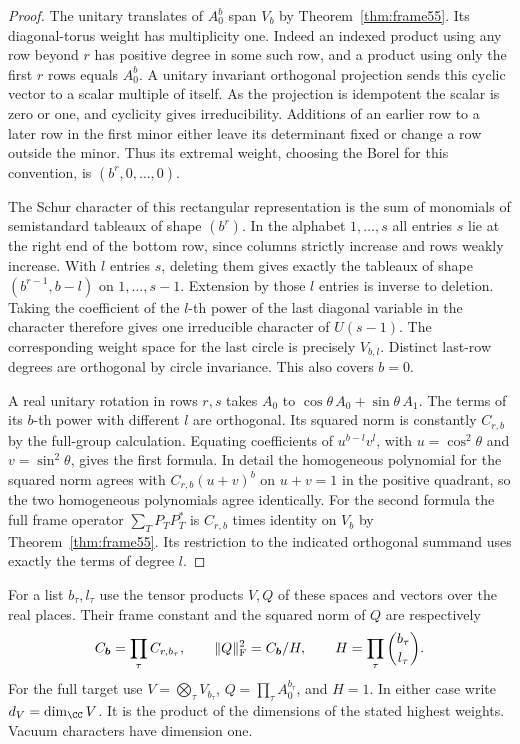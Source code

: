 \documentclass[a4paper,11pt]{article}
\theoremstyle{definition}
\theoremstyle{remark}
\numberwithin{equation}{section}
\begin{document}
\begin{proof}
The unitary translates of \(A_0^b\) span \(V_b\) by
Theorem~\ref{thm:frame55}. Its diagonal-torus weight has
multiplicity one. Indeed an indexed product using any row beyond
\(r\) has positive degree in some such row, and a product using
only the first \(r\) rows equals \(A_0^b\). A unitary invariant
orthogonal projection sends this cyclic vector to a scalar
multiple of itself. As the projection is idempotent the scalar
is zero or one, and cyclicity gives irreducibility. Additions of
an earlier row to a later row in the first minor either leave its
determinant fixed or change a row outside the minor. Thus its
extremal weight, choosing the Borel for this convention, is
\((b^r,0,\ldots,0)\).

The Schur character of this rectangular representation is the
sum of monomials of semistandard tableaux of shape \((b^r)\).
In the alphabet \(1,\ldots,s\) all entries \(s\) lie at the
right end of the bottom row, since columns strictly increase
and rows weakly increase. With \(l\) entries \(s\), deleting
them gives exactly the tableaux of shape \((b^{r-1},b-l)\)
on \(1,\ldots,s-1\). Extension by those \(l\) entries is
inverse to deletion. Taking the coefficient of the \(l\)-th
power of the last diagonal variable in the character therefore
gives one irreducible character of \(U(s-1)\). The corresponding
weight space for the last circle is precisely \(V_{b,l}\).
Distinct last-row degrees are orthogonal by circle invariance.
This also covers \(b=0\).

A real unitary rotation in rows \(r,s\) takes \(A_0\) to
\(\cos\theta\, A_0+\sin\theta\, A_1\). The terms of its \(b\)-th
power with different \(l\) are orthogonal. Its squared norm is
constantly \(C_{r,b}\) by the full-group calculation. Equating
coefficients of \(u^{b-l}v^l\), with \(u=\cos^2\theta\) and
\(v=\sin^2\theta\), gives the first formula. In detail the
homogeneous polynomial for the squared norm agrees with
\(C_{r,b}(u+v)^b\) on \(u+v=1\) in the positive quadrant,
so the two homogeneous polynomials agree identically.
For the second formula the full frame operator
\(\sum_T P_T P_T^*\) is \(C_{r,b}\) times identity on \(V_b\)
by Theorem~\ref{thm:frame55}. Its restriction to the indicated
orthogonal summand uses exactly the terms of degree \(l\).
\end{proof}

For a list \(b_\tau,l_\tau\) use the tensor products \(V,Q\)
of these spaces and vectors over the real places. Their frame
constant and the squared norm of \(Q\) are respectively
\[
 C_{\boldsymbol b}=\prod_\tau C_{r,b_\tau},\qquad
 \|Q\|_{\rm F}^2=C_{\boldsymbol b}/H,\qquad
 H=\prod_\tau\binom{b_\tau}{l_\tau}.
\]
For the full target use \(V=\bigotimes_\tau V_{b_\tau}\),
\(Q=\prod_\tau A_0^{b_\tau}\), and \(H=1\). In either case
write \(d_V=\dim_{\CC}V\). It is the product of the dimensions
of the stated highest weights. Vacuum characters have dimension one.
\end{document}
